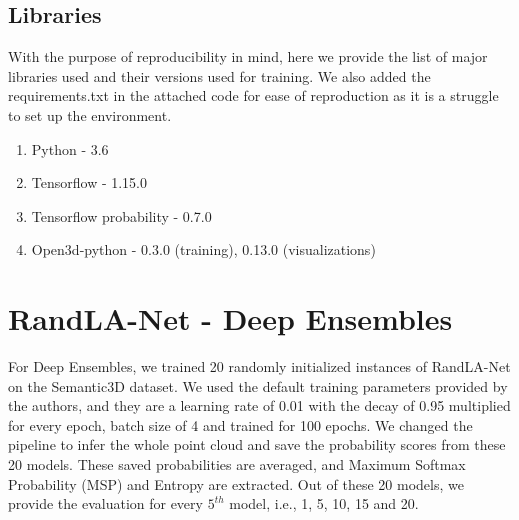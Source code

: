     \subsection*{Libraries}
    With the purpose of reproducibility in mind, here we provide the list of major libraries used and their versions used for training.
    We also added the requirements.txt in the attached code for ease of reproduction as it is a struggle to set up the environment.
    \begin{enumerate}
        \item Python - 3.6
        \item Tensorflow - 1.15.0
        \item Tensorflow probability - 0.7.0
        \item Open3d-python - 0.3.0 (training), 0.13.0 (visualizations)
    \end{enumerate}
    
    \section{RandLA-Net - Deep Ensembles}
    \label{sec:de_setup}
    For Deep Ensembles, we trained 20 randomly initialized instances of RandLA-Net on the Semantic3D dataset.
    We used the default training parameters provided by the authors, and they are a learning rate of 0.01 with the decay of 0.95 multiplied for every epoch, batch size of 4 and trained for 100 epochs.
    We changed the pipeline to infer the whole point cloud and save the probability scores from these 20 models.
    These saved probabilities are averaged, and Maximum Softmax Probability (MSP) and Entropy are extracted.
    Out of these 20 models, we provide the evaluation for every $5^{th}$ model, i.e., 1, 5, 10, 15 and 20.
